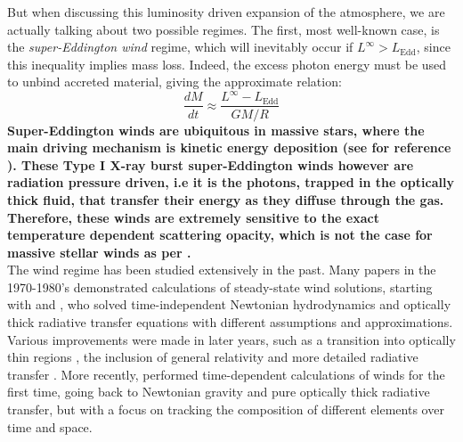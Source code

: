 \documentclass[../main.tex]{subfiles}
\newcommand{\Ledd}{L_\text{Edd}}
\begin{document}
But when discussing this luminosity driven expansion of the atmosphere, we are actually talking about two possible regimes. The first, most well-known case, is the \textit{super-Eddington wind} regime, which will inevitably occur if $L^\infty>\Ledd$, since this inequality implies mass loss.  Indeed, the excess photon energy must be used to unbind accreted material, giving the approximate relation:
\begin{equation}
    \frac{dM}{dt}\approx \frac{L^\infty-\Ledd}{GM/R}
\end{equation}
\textbf{Super-Eddington winds are ubiquitous in massive stars, where the main driving mechanism is kinetic energy deposition (see for reference \citet{Quataert2016}).  These Type I X-ray burst super-Eddington winds however are radiation pressure driven, i.e it is the photons, trapped in the optically thick fluid, that transfer their energy as they diffuse through the gas. Therefore, these winds are extremely sensitive to the exact temperature dependent scattering opacity, which is not the case for massive stellar winds as per \citet{Quataert2016}.}\\

The wind regime has been studied extensively in the past. Many papers in the 1970-1980's demonstrated calculations of steady-state wind solutions, starting with \citet{Ebisuzaki1983} and \citet{Kato1983a}, who solved time-independent Newtonian hydrodynamics and optically thick radiative transfer equations with different assumptions and approximations.  Various improvements were made in later years, such as a transition into optically thin regions \citep{Quinn1985}, the inclusion of general relativity \citep{Paczynski1986b} and more detailed radiative transfer \citep{Joss1987}.  More recently, \citet{YuHangWeinberg2018} performed time-dependent calculations of winds for the first time, going back to Newtonian gravity and pure optically thick radiative transfer, but with a focus on tracking the composition of different elements over time and space.\\
\end{document}
